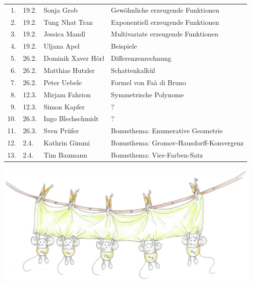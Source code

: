 \documentclass[a4paper,ngerman,landscape,12pt]{scrartcl}
\begin{document}
\begin{center}
  \begin{minipage}{1.00\textwidth}
  \begin{center}
    \Large
    \begin{tabular}{r@{\quad}l@{\quad}l@{\quad}l}
        1. &
        19.2. &
        Sonja Grob &
        Gewöhnliche erzeugende Funktionen \\[0.1em]
        2. &
        19.2. &
        Tung Nhat Tran &
        Exponentiell erzeugende Funktionen \\[0.1em]
        3. &
        19.2. &
        Jessica Mandl &
        Multivariate erzeugende Funktionen \\[0.1em]
        4. &
        19.2. &
        Uljana Apel &
        Beispiele \\[0.1em]
        5. &
        26.2. &
        Dominik Xaver Hörl &
        Differenzenrechnung \\[0.1em]
        6. &
        26.2. &
        Matthias Hutzler &
        Schattenkalkül \\[0.1em]
        7. &
        26.2. &
        Peter Uebele &
        Formel von Faà di Bruno \\[0.1em]
        8. &
        12.3. &
        Mirjam Fahrion &
        Symmetrische Polynome \\[0.1em]
        9. &
        12.3. &
        Simon Kapfer &
        ? \\[0.1em]
        10. &
        26.3. &
        Ingo Blechschmidt &
        ? \\[0.1em]
        11. &
        26.3. &
        Sven Prüfer &
        Bonusthema: Enumerative Geometrie \\[0.1em]
        12. &
        2.4. &
        Kathrin Gimmi &
        Bonusthema: Gromov-Hausdorff-Konvergenz \\[0.1em]
        13. &
        2.4. &
        Tim Baumann &
        Bonusthema: Vier-Farben-Satz
    \end{tabular}

    \includegraphics[scale=0.8]{../erzeugende-funktion}
  \end{center}
  \end{minipage}
\end{center}

\end{document}
